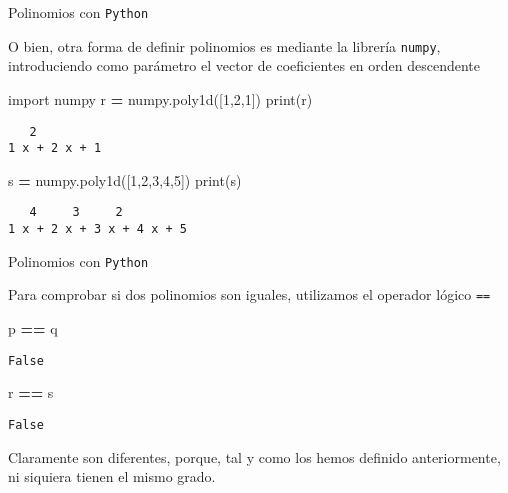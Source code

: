 \documentclass[
  ignorenonframetext,
]{beamer}
\newenvironment{Shaded}{\begin{snugshade}}{\end{snugshade}}
\newcommand{\BuiltInTok}[1]{#1}
\newcommand{\DecValTok}[1]{\textcolor[rgb]{0.00,0.00,0.81}{#1}}
\newcommand{\ImportTok}[1]{#1}
\newcommand{\NormalTok}[1]{#1}
\newcommand{\OperatorTok}[1]{\textcolor[rgb]{0.81,0.36,0.00}{\textbf{#1}}}
\begin{document}
\begin{frame}[fragile]{Polinomios con \texttt{Python}}
\protect\hypertarget{polinomios-con-python-2}{}

O bien, otra forma de definir polinomios es mediante la librería
\texttt{numpy}, introduciendo como parámetro el vector de coeficientes
en orden descendente

\begin{Shaded}
\begin{Highlighting}[]
\ImportTok{import}\NormalTok{ numpy}
\NormalTok{r }\OperatorTok{=}\NormalTok{ numpy.poly1d([}\DecValTok{1}\NormalTok{,}\DecValTok{2}\NormalTok{,}\DecValTok{1}\NormalTok{]) }
\BuiltInTok{print}\NormalTok{(r)}
\end{Highlighting}
\end{Shaded}

\begin{verbatim}
   2
1 x + 2 x + 1
\end{verbatim}

\begin{Shaded}
\begin{Highlighting}[]
\NormalTok{s }\OperatorTok{=}\NormalTok{ numpy.poly1d([}\DecValTok{1}\NormalTok{,}\DecValTok{2}\NormalTok{,}\DecValTok{3}\NormalTok{,}\DecValTok{4}\NormalTok{,}\DecValTok{5}\NormalTok{])}
\BuiltInTok{print}\NormalTok{(s)}
\end{Highlighting}
\end{Shaded}

\begin{verbatim}
   4     3     2
1 x + 2 x + 3 x + 4 x + 5
\end{verbatim}

\end{frame}

\begin{frame}[fragile]{Polinomios con \texttt{Python}}
\protect\hypertarget{polinomios-con-python-3}{}

Para comprobar si dos polinomios son iguales, utilizamos el operador
lógico \texttt{==}

\begin{Shaded}
\begin{Highlighting}[]
\NormalTok{p }\OperatorTok{==}\NormalTok{ q  }
\end{Highlighting}
\end{Shaded}

\begin{verbatim}
False
\end{verbatim}

\begin{Shaded}
\begin{Highlighting}[]
\NormalTok{r }\OperatorTok{==}\NormalTok{ s}
\end{Highlighting}
\end{Shaded}

\begin{verbatim}
False
\end{verbatim}

Claramente son diferentes, porque, tal y como los hemos definido
anteriormente, ni siquiera tienen el mismo grado.

\end{frame}
\end{document}
